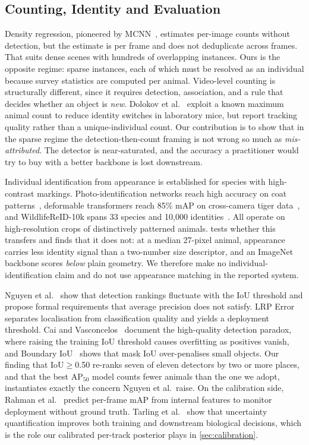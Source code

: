 \subsection{Counting, Identity and Evaluation}
\label{sec:rw:counting}

Density regression, pioneered by MCNN~\cite{zhang2016single}, estimates per-image counts
without detection, but the estimate is per frame and does not deduplicate across frames.
That suits dense scenes with hundreds of overlapping instances. Ours is the opposite regime:
sparse instances, each of which must be resolved as an individual because survey statistics
are computed per animal. Video-level counting is structurally different, since it requires
detection, association, and a rule that decides whether an object is \emph{new}. Dolokov et
al.~\cite{dolokov2023upper} exploit a known maximum animal count to reduce identity switches
in laboratory mice, but report tracking quality rather than a unique-individual count. Our
contribution is to show that in the sparse regime the detection-then-count framing is not wrong so much as \emph{mis-attributed}. The detector is near-saturated, and the accuracy a
practitioner would try to buy with a better backbone is lost downstream.

Individual identification from appearance is established for species with high-contrast
markings. Photo-identification networks reach high accuracy on coat
patterns~\cite{miele2020revisiting}, deformable transformers reach 85\% mAP on cross-camera
tiger data~\cite{li2024redeformtr}, and WildlifeReID-10k spans 33 species and 10{,}000
identities~\cite{adam2025wildlifereid10k}. All operate on high-resolution crops of
distinctively patterned animals.  tests whether this transfers and finds that
it does not: at a median 27-pixel animal, appearance carries less identity signal than a
two-number size descriptor, and an ImageNet backbone scores \emph{below} plain geometry. We
therefore make no individual-identification claim and do not use appearance matching in the
reported system.

Nguyen et al.~\cite{nguyen2023trustworthy} show that detection rankings fluctuate with the
IoU threshold and propose formal requirements that average precision does not satisfy. LRP
Error~\cite{oksuz2022lrp} separates localisation from classification quality and yields a
deployment threshold. Cai and Vasconcelos~\cite{cai2021cascade} document the high-quality
detection paradox, where raising the training IoU threshold causes overfitting as positives
vanish, and Boundary IoU~\cite{cheng2021boundary} shows that mask IoU over-penalises small
objects. Our finding that IoU$\geq$0.50 re-ranks seven of eleven detectors by two or more
places, and that the best AP$_{50}$ model counts fewer animals than the one we adopt,
instantiates exactly the concern Nguyen et al.\ raise. On the calibration side, Rahman et
al.~\cite{rahman2021perframe} predict per-frame mAP from internal features to monitor
deployment without ground truth. Tarling et al.~\cite{tarling2022deep} show that
uncertainty quantification improves both training and downstream biological decisions,
which is the role our calibrated per-track posterior plays in \cref{sec:calibration}.
\label{sec:othermodalities}

